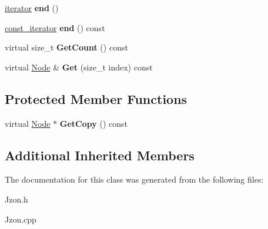 \begin{DoxyCompactItemize}
\item 
\hypertarget{class_jzon_1_1_array_a19fb0b40b929903bc544442c9ff1c7bc}{\hyperlink{class_jzon_1_1_array_1_1iterator}{iterator} {\bfseries end} ()}\label{class_jzon_1_1_array_a19fb0b40b929903bc544442c9ff1c7bc}

\item 
\hypertarget{class_jzon_1_1_array_a57c4259ea3192d8b25b8b6ae3a033a32}{\hyperlink{class_jzon_1_1_array_1_1const__iterator}{const\-\_\-iterator} {\bfseries end} () const }\label{class_jzon_1_1_array_a57c4259ea3192d8b25b8b6ae3a033a32}

\item 
\hypertarget{class_jzon_1_1_array_a95067395f5c19c00a02795d74ea0f1ee}{virtual size\-\_\-t {\bfseries Get\-Count} () const }\label{class_jzon_1_1_array_a95067395f5c19c00a02795d74ea0f1ee}

\item 
\hypertarget{class_jzon_1_1_array_ace64adcc3232816e3f705b74e63c4ab1}{virtual \hyperlink{class_jzon_1_1_node}{Node} \& {\bfseries Get} (size\-\_\-t index) const }\label{class_jzon_1_1_array_ace64adcc3232816e3f705b74e63c4ab1}

\end{DoxyCompactItemize}
\subsection*{Protected Member Functions}
\begin{DoxyCompactItemize}
\item 
\hypertarget{class_jzon_1_1_array_a39dc58ef32255cd8237dc726a2288fa7}{virtual \hyperlink{class_jzon_1_1_node}{Node} $\ast$ {\bfseries Get\-Copy} () const }\label{class_jzon_1_1_array_a39dc58ef32255cd8237dc726a2288fa7}

\end{DoxyCompactItemize}
\subsection*{Additional Inherited Members}


The documentation for this class was generated from the following files\-:\begin{DoxyCompactItemize}
\item 
Jzon.\-h\item 
Jzon.\-cpp\end{DoxyCompactItemize}
